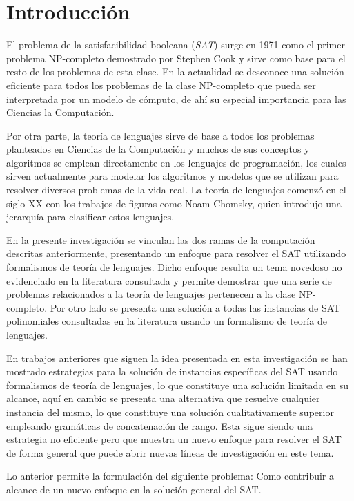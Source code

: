 \chapter*{Introducción}\label{chapter:introduction}

El problema de la satisfacibilidad booleana (\textit{SAT}) surge en 1971 como el primer problema NP-completo demostrado por
Stephen Cook y sirve como base para el resto de los problemas de esta clase. En la actualidad se desconoce una solución eficiente
para todos los problemas de la clase NP-completo que pueda ser interpretada por un modelo de cómputo,
de ahí su especial importancia para las Ciencias la Computación.

Por otra parte, la teoría de lenguajes sirve de base a todos los problemas planteados en Ciencias de la Computación y muchos
de sus conceptos y algoritmos se emplean directamente en los lenguajes de programación, los cuales sirven actualmente
para modelar los algoritmos y modelos que se utilizan para resolver diversos problemas de la vida real. La teoría de lenguajes comenzó
en el siglo XX con los trabajos de figuras como Noam Chomsky, quien introdujo una jerarquía para clasificar estos lenguajes.

En la presente investigación se vinculan las dos ramas de la computación descritas anteriormente, presentando un enfoque para resolver el SAT
utilizando formalismos de teoría de lenguajes. Dicho enfoque resulta un tema novedoso no evidenciado en la literatura consultada
y permite demostrar que una serie de problemas relacionados a la teoría de lenguajes pertenecen a la clase NP-completo. Por otro lado
se presenta una solución a todas las instancias de SAT polinomiales consultadas en la literatura usando un formalismo de teoría de
lenguajes.

En trabajos anteriores que siguen la idea presentada en esta investigación se han mostrado estrategias para la solución
de instancias específicas del SAT usando formalismos de teoría de lenguajes, lo que constituye una solución limitada en su alcance,
aquí en cambio se presenta una alternativa que resuelve cualquier instancia del mismo, lo que constituye una solución
cualitativamente superior empleando gramáticas de concatenación de rango. Esta sigue siendo una estrategia no eficiente pero que
muestra un nuevo enfoque para resolver el SAT de forma general que puede abrir nuevas líneas de investigación en este tema.

Lo anterior permite la formulación del siguiente problema: Como contribuir a alcance de un nuevo enfoque en la solución general del SAT.

